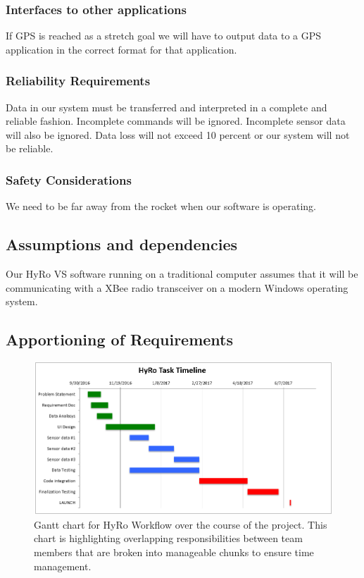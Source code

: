 \documentclass[10pt,draftclsnofoot,onecolumn,compsoc]{IEEEtran}
\begin{document}
\subsubsection{\bf  Interfaces to other applications} If GPS is reached as a stretch goal we will have to output data to a GPS application in the correct format for that application.

\subsubsection{\bf Reliability Requirements} Data in our system must be transferred and interpreted in a complete and reliable fashion. Incomplete commands will be ignored. Incomplete sensor data will also be ignored. Data loss will not exceed 10 percent or our system will not be reliable.

\subsubsection{\bf Safety Considerations} We need to be far away from the rocket when our software is operating.

\subsection{Assumptions and dependencies}
Our HyRo VS software running on a traditional computer assumes that it will be communicating with a XBee radio transceiver on a modern Windows operating system.

\subsection{Apportioning of Requirements}
\begin{figure}
  \caption{Gantt chart for HyRo Workflow over the course of the project. This chart is highlighting overlapping responsibilities between team members that are broken into manageable chunks to ensure time management. }
  \centering
	\includegraphics[scale=.75]{GanntChart}
\end{figure}
\FloatBarrier
\end{document}
